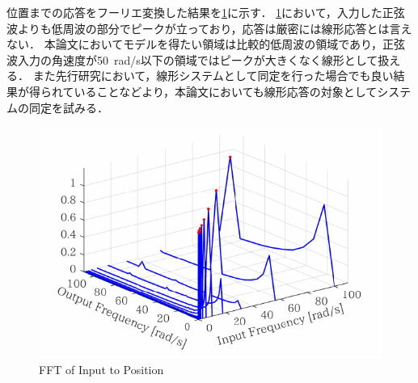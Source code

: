 位置までの応答をフーリエ変換した結果を\figname\ref{fig:crop-pos_FFT}に示す．
\figname\ref{fig:crop-pos_FFT}において，入力した正弦波よりも低周波の部分でピークが立っており，応答は厳密には線形応答とは言えない．
本論文においてモデルを得たい領域は比較的低周波の領域であり，正弦波入力の角速度が\SI{50}{rad/s}以下の領域ではピークが大きくなく線形として扱える．
また先行研究において，線形システムとして同定を行った場合でも良い結果が得られていることなどより，本論文においても線形応答の対象としてシステムの同定を試みる．
\begin{figure}[t]
    \centering
        \includegraphics[keepaspectratio, scale=1.0]{contents/システム同定/figure/crop-pos_FFT.pdf}
        \caption{FFT of Input to Position}
        \label{fig:crop-pos_FFT}
\end{figure}

